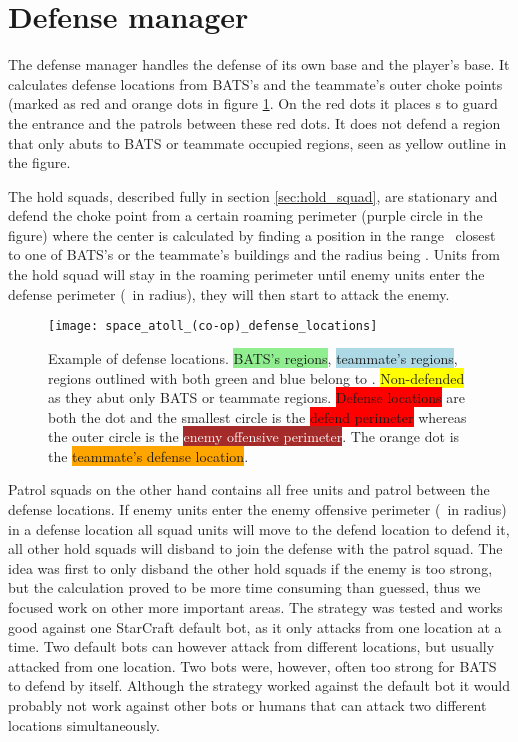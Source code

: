 \section{Defense manager}
\label{sec:defense_manager}
The defense manager handles the defense of its own base and the player’s base. It calculates defense locations from BATS's and the teammate's outer choke points (marked as red and orange dots in figure \ref{fig:defense_locations}. On the red dots it places s to guard the entrance and the  patrols between these red dots. It does not defend a region that only abuts to BATS or teammate occupied regions, seen as yellow outline in the figure.

The hold squads, described fully in section \ref{sec:hold_squad}, are stationary and defend the choke point from a certain roaming perimeter (purple circle in the figure) where the center is calculated by finding a position in the range \squadDefendRoamDistanceMinMax~closest to one of BATS’s or the teammate’s buildings and the radius being \squadDefendRoamPerimeter. Units from the hold squad will stay in the roaming perimeter until enemy units enter the defense perimeter (\squadDefendDefendPerimeter~in radius), they will then start to attack the enemy. 

\begin{figure}[htb]
\centering
\texttt{[image: space\_atoll\_(co-op)\_defense\_locations]}
\caption[Defense locations example]{Example of defense locations. \colorbox{LightGreen}{BATS’s regions}, \colorbox{LightBlue}{teammate’s regions}, regions outlined with both green and blue belong to . \colorbox{Yellow}{Non-defended} as they abut only BATS or teammate regions. \colorbox{Red}{Defense locations} are both the dot and the smallest circle is the \colorbox{Red}{defend perimeter} whereas the outer circle is the \colorbox{Brown}{\textcolor{white}{enemy offensive perimeter}}. The orange dot is the \colorbox{Orange}{teammate's defense location}.}
\label{fig:defense_locations}
\end{figure}

Patrol squads on the other hand contains all free units and patrol between the defense locations. If enemy units enter the enemy offensive perimeter (\squadDefendEnemyOffensivePerimeter~in radius) in a defense location all squad units will move to the defend location to defend it, all other hold squads will disband to join the defense with the patrol squad. The idea was first to only disband the other hold squads if the enemy is too strong, but the calculation proved to be more time consuming than guessed, thus we focused work on other more important areas. The strategy was tested and works good against one StarCraft default bot, as it only attacks from one location at a time. Two default bots can however attack from different locations, but usually attacked from one location. Two bots were, however, often too strong for BATS to defend by itself. Although the strategy worked against the default bot it would probably not work against other bots or humans that can attack two different locations simultaneously.

